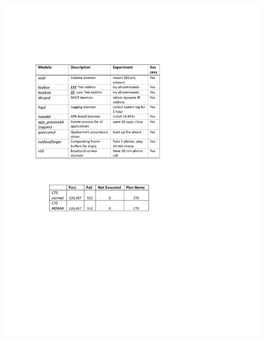 \begin{table}[h]
\begin{minipage}[b]{0.5\textwidth}
		\includegraphics[scale=0.80]{norax/figures/cts}
	\end{minipage}
\end{table}




%
%

